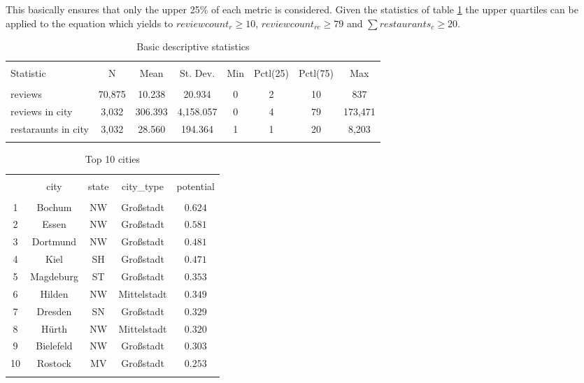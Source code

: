 This basically ensures that only the upper 25\% of each metric is considered.
Given the statistics of table \ref{tab:stats} the upper quartiles can be applied to the equation which yields to $reviewcount_{r} \geq 10 $, $reviewcount_{rc} \geq 79$ and $\sum restaurants_{c} \geq 20$.
\begin{table}[!htbp] \centering
	\caption{Basic descriptive statistics}
	\label{tab:stats}
	\begin{tabular}{@{\extracolsep{5pt}}lccccccc}
		\\[-1.8ex]\hline
		\hline \\[-1.8ex]
		Statistic & \multicolumn{1}{c}{N} & \multicolumn{1}{c}{Mean} & \multicolumn{1}{c}{St. Dev.} & \multicolumn{1}{c}{Min} & \multicolumn{1}{c}{Pctl(25)} & \multicolumn{1}{c}{Pctl(75)} & \multicolumn{1}{c}{Max} \\
		\hline \\[-1.8ex]
		reviews & 70,875 & 10.238 & 20.934 & 0 & 2 & 10 & 837 \\
		reviews in city & 3,032 & 306.393 & 4,158.057 & 0 & 4 & 79 & 173,471 \\
		restaraunts in city & 3,032 & 28.560 & 194.364 & 1 & 1 & 20 & 8,203 \\
		\hline \\[-1.8ex]
	\end{tabular}
\end{table}
\begin{table}[!htbp] \centering
	\caption{Top 10 cities}
	\label{tab:top10cities}
	\begin{tabular}{@{\extracolsep{5pt}} ccccc}
		\\[-1.8ex]\hline
		\hline \\[-1.8ex]
		& city & state & city\_type & potential \\
		\hline \\[-1.8ex]
		1 & Bochum & NW & Großstadt & $0.624$ \\
		2 & Essen & NW & Großstadt & $0.581$ \\
		3 & Dortmund & NW & Großstadt & $0.481$ \\
		4 & Kiel & SH & Großstadt & $0.471$ \\
		5 & Magdeburg & ST & Großstadt & $0.353$ \\
		6 & Hilden & NW & Mittelstadt & $0.349$ \\
		7 & Dresden & SN & Großstadt & $0.329$ \\
		8 & Hürth & NW & Mittelstadt & $0.320$ \\
		9 & Bielefeld & NW & Großstadt & $0.303$ \\
		10 & Rostock & MV & Großstadt & $0.253$ \\
		\hline \\[-1.8ex]
	\end{tabular}
\end{table}
